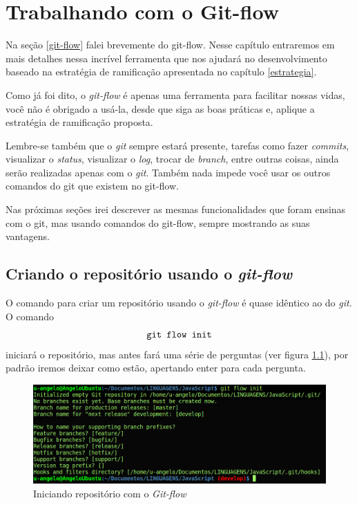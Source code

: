 \documentclass[12pt,openright,oneside,a4paper,english,brazil]{abntex2}
\begin{document}
\chapter{Trabalhando com o Git-flow}

Na seção \ref{git-flow} falei brevemente do git-flow. Nesse capítulo entraremos em mais detalhes nessa incrível ferramenta que nos ajudará no desenvolvimento baseado na estratégia de ramificação apresentada no capítulo \ref{estrategia}. 

Como já foi dito, o \textit{git-flow} é apenas uma ferramenta para facilitar nossas vidas, você não é obrigado a usá-la, desde que siga as boas práticas e, aplique a estratégia de ramificação proposta. 

Lembre-se também que o \textit{git} sempre estará presente, tarefas como fazer \textit{commits}, visualizar o \textit{status}, visualizar o \textit{log}, trocar de \textit{branch}, entre outras coisas, ainda serão realizadas apenas com o \textit{git}. Também nada impede você usar os outros comandos do git que existem no git-flow.

Nas próximas seções irei descrever as mesmas funcionalidades que foram ensinas com o git, mas usando comandos do git-flow, sempre mostrando as suas vantagens.

\section{Criando o repositório usando o \textit{git-flow}}

O comando para criar um repositório usando o \textit{git-flow} é quase idêntico ao do \textit{git}. O comando $$\verb|git flow init|$$ iniciará o repositório, mas antes fará uma série de perguntas (ver figura \ref{initGitFlow}), por padrão iremos deixar como estão, apertando enter para cada pergunta.

\begin{figure}[htb]
	\caption{\label{initGitFlow}Iniciando repositório com o \textit{Git-flow}}
	\begin{center}
		\includegraphics[width=1\linewidth]{initGitFlow}
	\end{center}
\end{figure}
\end{document}

